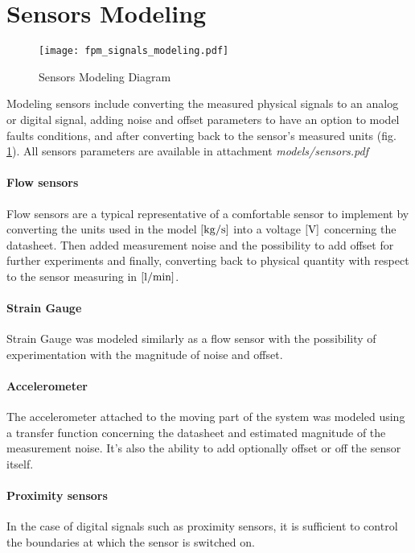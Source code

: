 \section{Sensors Modeling}
\begin{figure}[h!]
    \centering
    \texttt{[image: fpm\_signals\_modeling.pdf]}
    \caption{Sensors Modeling Diagram}
    \label{fig:sig_mod_diag}
\end{figure}


Modeling sensors include converting the measured physical signals to an
analog or digital signal, adding noise and offset parameters to have an
option to model faults conditions, and after converting back to the
sensor's measured units (fig. \ref{fig:sig_mod_diag}). All sensors
parameters are available in attachment \textit{models/sensors.pdf }

\paragraph{Flow sensors}
Flow sensors are a typical representative of a comfortable sensor to
implement by converting the units used in the model $\rm [kg/s]$ into a voltage
$\rm [V]$ concerning the datasheet. Then added measurement noise and the
possibility to add offset for further experiments and finally, converting
back to physical quantity with respect to the sensor measuring in $\rm
[l/min]$.

\paragraph{Strain Gauge}
Strain Gauge was modeled similarly as a flow sensor with the possibility of
experimentation with the magnitude of noise and offset.

\paragraph{Accelerometer}
The accelerometer attached to the moving part of the system was modeled
using a transfer function concerning the datasheet and estimated magnitude
of the measurement noise. It's also the ability to add optionally offset or
off the sensor itself.

\paragraph{Proximity sensors} In the case of digital signals such as
proximity sensors, it is sufficient to control the boundaries at which the
sensor is switched on.


